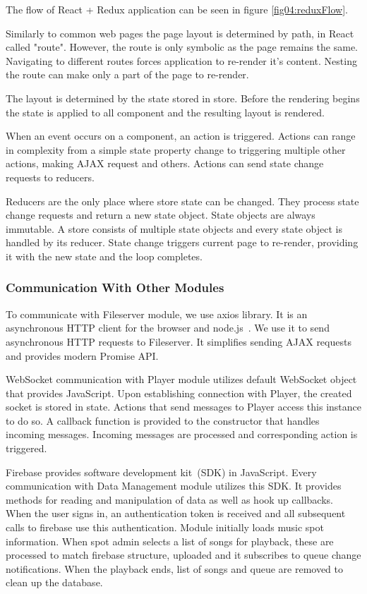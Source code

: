 The flow of React + Redux application can be seen in figure \ref{fig04:reduxFlow}.
\par
Similarly to common web pages the page layout is determined by path, in React called "route". However, the route is only symbolic as the page remains the same. Navigating to different routes forces application to re-render it's content. Nesting the route can make only a part of the page to re-render.
\par
The layout is determined by the state stored in store. Before the rendering begins the state is applied to all component and the resulting layout is rendered.
\par
When an event occurs on a component, an action is triggered. Actions can range in complexity from a simple state property change to triggering multiple other actions, making AJAX request and others. Actions can send state change requests to reducers.
\par
Reducers are the only place where store state can be changed. They process state change requests and return a new state object. State objects are always immutable. A store consists of multiple state objects and every state object is handled by its reducer. State change triggers current page to re-render, providing it with the new state and the loop completes.

\subsubsection{Communication With Other Modules}

To communicate with Fileserver module, we use axios library. It is an asynchronous HTTP client for the browser and node.js~\citep{axios}. We use it to send asynchronous HTTP requests to Fileserver. It simplifies sending AJAX requests and provides modern Promise API. 
\par
WebSocket communication with Player module utilizes default WebSocket object that provides JavaScript. Upon establishing connection with Player, the created socket is stored in state. Actions that send messages to Player access this instance to do so. A callback function is provided to the constructor that handles incoming messages. Incoming messages are processed and corresponding action is triggered.
\par
Firebase provides software development kit~(SDK) in JavaScript. Every communication with Data Management module utilizes this SDK. It provides methods for reading and manipulation of data as well as hook up callbacks. When the user signs in, an authentication token is received and all subsequent calls to firebase use this authentication. Module initially loads music spot information. When spot admin selects a list of songs for playback, these are processed to match firebase structure, uploaded and it subscribes to queue change notifications. When the playback ends, list of songs and queue are removed to clean up the database.

